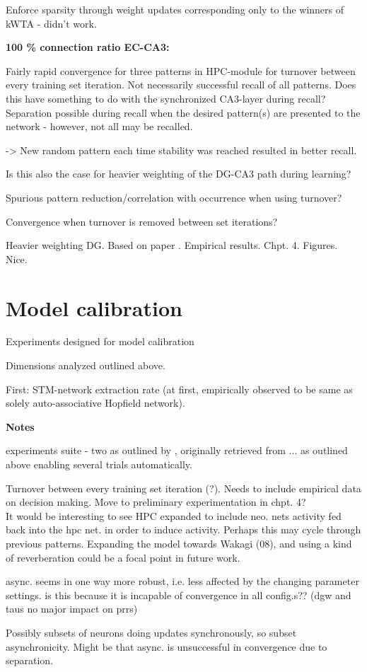 Enforce sparsity through weight updates corresponding only to the winners of kWTA - didn't work.

\textbf{100 \% connection ratio EC-CA3:}

Fairly rapid convergence for three patterns in HPC-module for turnover between every training set iteration. 
Not necessarily successful recall of all patterns. Does this have something to do with the synchronized CA3-layer during recall? Separation possible during recall when the desired pattern(s) are presented to the network - however, not all may be recalled.

-> New random pattern each time stability was reached resulted in better recall.

Is this also the case for heavier weighting of the DG-CA3 path during learning?

Spurious pattern reduction/correlation with occurrence when using turnover?

Convergence when turnover is removed between set iterations?

Heavier weighting DG. Based on paper \citep{Norman2003}. Empirical results. Chpt. 4. Figures. Nice.

\section*{Model calibration}

Experiments designed for model calibration

Dimensions analyzed outlined above.

First: STM-network extraction rate (at first, empirically observed to be same as solely auto-associative Hopfield network).


\textbf{Notes}

experiments suite - two as outlined by \citep{Hattori2014}, originally retrieved from ... as outlined above
enabling several trials automatically.

Turnover between every training set iteration (?). Needs to include empirical data on decision making. Move to preliminary experimentation in chpt. 4?
\\

It would be interesting to see HPC expanded to include neo. nets activity fed back into the hpc net. in order to induce activity. Perhaps this may cycle through previous patterns. Expanding the model towards Wakagi (08), and using a kind of reverberation could be a focal point in future work.

async. seems in one way more robust, i.e. less affected by the changing parameter settings. is this because it is incapable of convergence in all config.s?? (dgw and taus no major impact on prrs)

Possibly subsets of neurons doing updates synchronously, so subset asynchronicity. Might be that async. is unsuccessful in convergence due to separation.


\cleardoublepage
